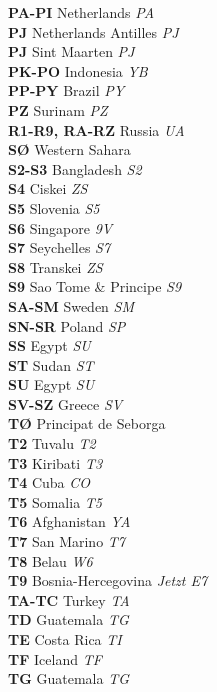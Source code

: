 \documentclass[landscape,a4paper]{article}
\begin{document}
\begin{multicols}{7}
\textbf{PA-PI} Netherlands \emph{PA} \\
\textbf{PJ} Netherlands Antilles \emph{PJ} \\
\textbf{PJ} Sint Maarten \emph{PJ} \\
\textbf{PK-PO} Indonesia \emph{YB} \\
\textbf{PP-PY} Brazil \emph{PY} \\
\textbf{PZ} Surinam \emph{PZ} \\
\textbf{R1-R9, RA-RZ} Russia \emph{UA} \\
\textbf{SØ} Western Sahara \\
\textbf{S2-S3} Bangladesh \emph{S2} \\
\textbf{S4} Ciskei \emph{ZS} \\
\textbf{S5} Slovenia \emph{S5} \\
\textbf{S6} Singapore \emph{9V} \\
\textbf{S7} Seychelles \emph{S7} \\
\textbf{S8} Transkei \emph{ZS} \\
\textbf{S9} Sao Tome \& Principe \emph{S9} \\
\textbf{SA-SM} Sweden \emph{SM} \\
\textbf{SN-SR} Poland \emph{SP} \\
\textbf{SS} Egypt \emph{SU} \\
\textbf{ST} Sudan \emph{ST} \\
\textbf{SU} Egypt \emph{SU} \\
\textbf{SV-SZ} Greece \emph{SV} \\
\textbf{TØ} Principat de Seborga \\
\textbf{T2} Tuvalu \emph{T2} \\
\textbf{T3} Kiribati \emph{T3} \\
\textbf{T4} Cuba \emph{CO} \\
\textbf{T5} Somalia \emph{T5} \\
\textbf{T6} Afghanistan \emph{YA} \\
\textbf{T7} San Marino \emph{T7} \\
\textbf{T8} Belau \emph{W6} \\
\textbf{T9} Bosnia-Hercegovina \emph{Jetzt E7} \\
\textbf{TA-TC} Turkey \emph{TA} \\
\textbf{TD} Guatemala \emph{TG} \\
\textbf{TE} Costa Rica \emph{TI} \\
\textbf{TF} Iceland \emph{TF} \\
\textbf{TG} Guatemala \emph{TG} \\

\end{multicols}
\end{document}
